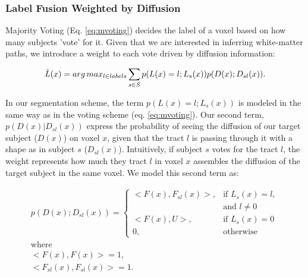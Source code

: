 \subsubsection{Label Fusion Weighted by Diffusion}
Majority Voting (Eq. \ref{eq:mvoting}) decides the label of a voxel based on
how many subjects 'vote' for it. Given that we are interested in inferring
white-matter paths, we introduce a weight to each vote driven by diffusion
information:


\begin{equation}
\label{eq:mvoting_weighted}
\hat L(x) = arg\,max_{l \in labels} \sum_{s\in S} p(L(x) = l ; L_s(x)) p(D(x) ; D_{sl}(x)).
\end{equation}

In our segmentation scheme, the term $p(L(x) = l ; L_s(x))$ is modeled in the same
way as in the voting scheme (eq. \ref{eq:mvoting}). Our second term,
$p(D(x) | D_{sl}(x))$ express the probability of seeing the diffusion of our
target subject ($D(x)$) on voxel $x$, given that the tract $l$ is passing through
it with a shape as in subject $s$ ($D_{sl}(x)$). Intuitively, if subject $s$ votes
for the tract $l$, the weight represents how much they tract $l$ in voxel $x$
assembles the diffusion of the target subject in the same voxel. We model this
second term as:

\begin{equation}
\label{eq:inner_odf}
\begin{aligned}
    p(D(x) ; D_{sl}(x)) = 
    \begin{cases}
        <F(x), F_{sl}(x)>,& \text{if } L_s(x) = l,\\
                        & \text{and } l \neq 0 \\
        <F(x), U>,& \text{if } L_s(x) = 0 \\
        0,& \text{otherwise}
    \end{cases} \\
    \text{where} \\
    <F(x),F(x)> = 1,\\ < F_{sl}(x), F_{sl}(x)>=1.
\end{aligned}
\end{equation}

